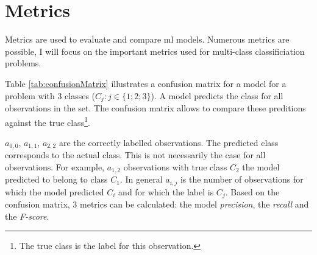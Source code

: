 \section{Metrics}

Metrics are used to evaluate and compare \acrlong{ml} models.
Numerous metrics are possible, I will focus on the important metrics used for multi-class classificiation problems.

Table \ref{tab:confusionMatrix} illustrates a confusion matrix for a model for a problem with 3 classes ($C_j:j\in \{1;2;3\}$). 
A model predicts the class for all observations in the set.
The confusion matrix allows to compare these preditions against the true class\footnote{The true class is the label for this observation.}.

$a_{0,0}$, $a_{1,1}$, $a_{2,2}$ are the correctly labelled observations. 
The predicted class corresponds to the actual class.
This is not necessarily the case for all observations. For example, $a_{1,2}$ observations with true class $C_2$ the model predicted to belong to class $C_1$.
In general $a_{i,j}$ is the number of observations for which the model predicted $C_i$ and for which the label is $C_j$.
Based on the confusion matrix, 3 metrics can be calculated: the model \textit{precision}, the \textit{recall} and the \textit{F-score}.\newline


